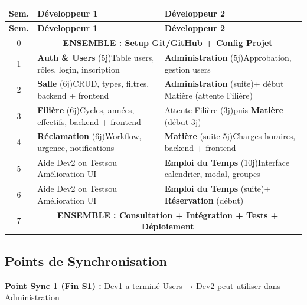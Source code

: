 \documentclass[12pt,a4paper]{article}
\begin{document}
\begin{longtable}{|c|p{6cm}|p{6cm}|}
\hline
\textbf{Sem.} & \textbf{Développeur 1} & \textbf{Développeur 2} \\
\hline
\endfirsthead
\hline
\textbf{Sem.} & \textbf{Développeur 1} & \textbf{Développeur 2} \\
\hline
\endhead
0 & \multicolumn{2}{c|}{\textbf{ENSEMBLE : Setup Git/GitHub + Config Projet}} \\
\hline
1 & \textbf{Auth \& Users} (5j)\newline Table users, rôles, login, inscription & \textbf{Administration} (5j)\newline Approbation, gestion users \\
\hline
2 & \textbf{Salle} (6j)\newline CRUD, types, filtres, backend + frontend & \textbf{Administration} (suite)\newline + début Matière (attente Filière) \\
\hline
3 & \textbf{Filière} (6j)\newline Cycles, années, effectifs, backend + frontend & Attente Filière (3j)\newline puis \textbf{Matière} (début 3j) \\
\hline
4 & \textbf{Réclamation} (6j)\newline Workflow, urgence, notifications & \textbf{Matière} (suite 5j)\newline Charges horaires, backend + frontend \\
\hline
5 & Aide Dev2 ou Tests\newline ou Amélioration UI & \textbf{Emploi du Temps} (10j)\newline Interface calendrier, modal, groupes \\
\hline
6 & Aide Dev2 ou Tests\newline ou Amélioration UI & \textbf{Emploi du Temps} (suite)\newline + \textbf{Réservation} (début) \\
\hline
7 & \multicolumn{2}{c|}{\textbf{ENSEMBLE : Consultation + Intégration + Tests + Déploiement}} \\
\hline
\end{longtable}

\subsection{Points de Synchronisation}

\textbf{Point Sync 1 (Fin S1) :} Dev1 a terminé Users → Dev2 peut utiliser dans Administration
\end{document}
